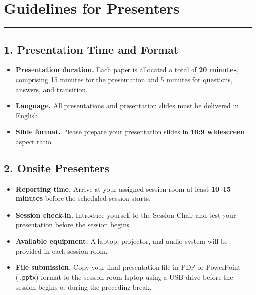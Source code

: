 \documentclass[10pt,a4paper]{article}
\begin{document}
\clearpage
\section{\textbf{Guidelines for Presenters}}
\color{conf}\rule{\linewidth}{1pt}\color{black}
\vspace{0.8em}

\subsection*{\color{conf}1. Presentation Time and Format}

\begin{itemize}[leftmargin=*, noitemsep]
    \item \textbf{Presentation duration.} Each paper is allocated a total of
    \textbf{20 minutes}, comprising 15 minutes for the presentation and
    5 minutes for questions, answers, and transition.

    \item \textbf{Language.} All presentations and presentation slides must be
    delivered in English.

    \item \textbf{Slide format.} Please prepare your presentation slides in
    \textbf{16:9 widescreen} aspect ratio.
\end{itemize}

\vspace{0.8em}

\subsection*{\color{conf}2. Onsite Presenters}

\begin{itemize}[leftmargin=*, noitemsep]
    \item \textbf{Reporting time.} Arrive at your assigned session room at least
    \textbf{10--15 minutes} before the scheduled session starts.

    \item \textbf{Session check-in.} Introduce yourself to the Session Chair and
    test your presentation before the session begins.

    \item \textbf{Available equipment.} A laptop, projector, and audio system
    will be provided in each session room.

    \item \textbf{File submission.} Copy your final presentation file in PDF or
    PowerPoint (\texttt{.pptx}) format to the session-room laptop using a USB
    drive before the session begins or during the preceding break.
\end{itemize}
\end{document}
